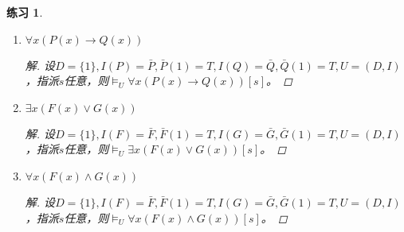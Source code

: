 \documentclass{article}
\newtheorem{Exercise}{练习}
\begin{document}
\begin{CJK*}{UTF8}{gbsn}
\begin{Exercise}
  \begin{enumerate}
    \item $\forall x(P(x)\to Q(x))$
    \begin{proof}[解]
      设$D=\{1\},I(P)=\bar{P},\bar{P}(1)=T,I(Q)=\bar{Q}, \bar{Q}(1)=T,U=(D,I)$，指派$s$任意，则$\vDash_U\forall x(P(x)\to Q(x))[s]$。
    \end{proof}
    \item $\exists x(F(x)\lor G(x))$
    \begin{proof}[解]
      设$D=\{1\},I(F)=\bar{F},\bar{F}(1)=T,I(G)=\bar{G}, \bar{G}(1)=T,U=(D,I)$，指派$s$任意，则$\vDash_U\exists x(F(x)\lor G(x))[s]$。
    \end{proof}
    \item $\forall x(F(x)\land G(x))$
    \begin{proof}[解]
      设$D=\{1\},I(F)=\bar{F},\bar{F}(1)=T,I(G)=\bar{G}, \bar{G}(1)=T,U=(D,I)$，指派$s$任意，则$\vDash_U\forall x(F(x)\land G(x))[s]$。
    \end{proof}
  \end{enumerate}
\end{Exercise}
\end{CJK*}
\end{document}
